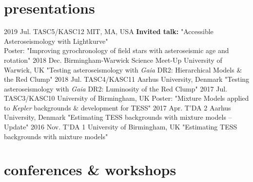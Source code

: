 \documentclass[]{k-cv} %
\begin{document}
\section{\color{c2}presentations}

\begin{entrylist}
\entry
{2019 Jul.}
{TASC5/KASC12}
{MIT, MA, USA}
{\textbf{\textcolor{c2}{Invited talk:}} "Accessible Asteroseismology with Lightkurve"\\ \small{Poster: "Improving gyrochronology of field stars with asteroseismic age and rotation"}}
\entry
{2018 Dec.}
{Birmingham-Warwick Science Meet-Up}
{University of Warwick, UK}
{"Testing asteroseismology with \textit{Gaia} DR2: Hierarchical Models \& the Red Clump"}
\entry
{2018 Jul.}
{TASC4/KASC11}
{Aarhus University, Denmark}
{"Testing asteroseismology with \textit{Gaia} DR2: Luminosity of the Red Clump"}
\entry
{2017 Jul.}
{TASC3/KASC10}
{University of Birmingham, UK}
{\small{Poster: "Mixture Models applied to \emph{Kepler} backgrounds \& development for TESS"}}
\entry
{2017 Apr.}
{T'DA 2}
{Aarhus University, Denmark}
{"Estimating TESS backgrounds with mixture models -- Update"}
\entry
{2016 Nov.}
{T'DA 1}
{University of Birmingham, UK}
{"Estimating TESS backgrounds with mixture models"}
\end{entrylist}

\section{\color{c3}conferences \& workshops}
\end{document}
